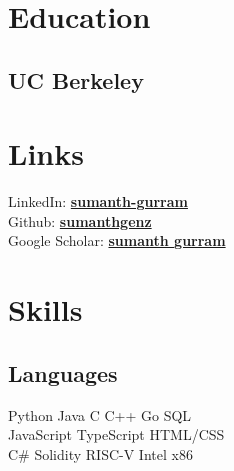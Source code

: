 \documentclass[]{deedy-resume-openfont}
\begin{document}
%
%
\lastupdated

%
%

%
%

\begin{minipage}[t]{0.33\textwidth} 


\section{Education} 

\subsection{UC Berkeley}

    
\sectionsep



\section{Links} 
LinkedIn:  \href{https://www.linkedin.com/in/sumanth-gurram}{\bf sumanth-gurram} \\
Github: \href{https://github.com/sumanthgenz}{\bf sumanthgenz} \\
Google Scholar: \href{https://scholar.google.com/citations?user=btuY0PQAAAAJ&hl=en&oi=sra}{\bf sumanth gurram} \\


\section{Skills}
\subsection{Languages}
Python \textbullet{} Java \textbullet{} C \textbullet{}
C++ \textbullet{} Go \textbullet{} SQL \textbullet{}\\
JavaScript \textbullet{} TypeScript \textbullet{} HTML/CSS \textbullet{} \\ 
C\# \textbullet{} Solidity \textbullet{} RISC-V \textbullet{} Intel x86  \\



\end{minipage}
\end{document}
